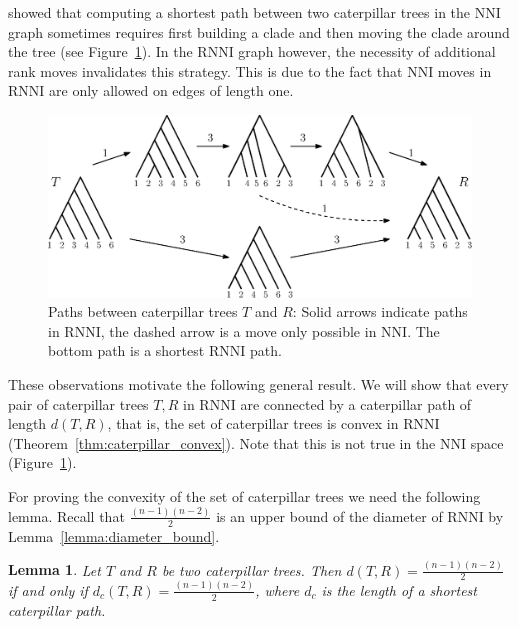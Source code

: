 \documentclass{amsart}
\newcommand{\nni}{\mathrm{NNI}}
\newcommand{\rnni}{\mathrm{RNNI}}
\newtheorem{lemma}[theorem]{Lemma}
\begin{document}
\textcite{Gavryushkin2018-ol} showed that computing a shortest path between two caterpillar trees in the $\nni$ graph sometimes requires first building a clade and then moving the clade around the tree (see Figure~\ref{fig:NNI_vs_RNNI}).
In the $\rnni$ graph however, the necessity of additional rank moves invalidates this strategy.
This is due to the fact that $\nni$ moves in $\rnni$ are only allowed on edges of length one.

\begin{figure}[H]
\centering
\includegraphics[width=\textwidth]{NNI_vs_RNNI}
\vspace{12pt}
\caption{Paths between caterpillar trees $T$ and $R$: Solid arrows indicate paths in $\rnni$, the dashed arrow is a move only possible in $\nni$.
The bottom path is a shortest $\rnni$ path.}
\label{fig:NNI_vs_RNNI}
\end{figure}

These observations motivate the following general result.
We will show that every pair of caterpillar trees $T, R$ in $\rnni$ are connected by a caterpillar path of length $d(T,R)$, that is, the set of caterpillar trees is convex in $\rnni$ (Theorem~\ref{thm:caterpillar_convex}).
Note that this is not true in the $\nni$ space (Figure~\ref{fig:NNI_vs_RNNI}).

For proving the convexity of the set of caterpillar trees we need the following lemma.
Recall that $\frac{(n-1)(n-2)}{2}$ is an upper bound of the diameter of $\rnni$ by Lemma~\ref{lemma:diameter_bound}.

\begin{lemma}
Let $T$ and $R$ be two caterpillar trees.
Then $d(T,R) = \frac{(n-1)(n-2)}{2}$ if and only if $d_c(T,R) = \frac{(n-1)(n-2)}{2}$, where $d_c$ is the length of a shortest caterpillar path.
\label{lemma:caterpillar_dist=diameter}
\end{lemma}
\end{document}

